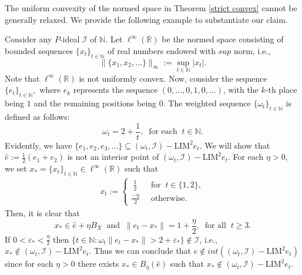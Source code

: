 \documentclass[reqno]{amsart}
\begin{document}
{The uniform convexity of the normed space in  Theorem \ref{strict convex} cannot be generally relaxed. We provide the following example to substantiate  our claim.
\begin{example} \label{ex 2.12}
	Consider any $P$-ideal $\mathcal{I}$ of $\mathbb{N}.$
	Let $\ell^\infty(\mathbb{R})$ be the normed  space consisting of  bounded sequences $\{x_t\}_{t\in\mathbb{N}}$ of real numbers endowed with $sup$ norm, i.e.,
	$$\|\{x_1,x_2,...\}\|_{\infty}:=\displaystyle\sup_{t\in\mathbb{N}}|x_t|.$$ 
	Note that $\ell^\infty(\mathbb{R})$  is not uniformly convex. Now, consider the sequence $\{e_t\}_{t\in\mathbb{N}},$ where $e_k$ represents the sequence $(0,...,0,1,0,...)$, with the $k$-th place being $1$ and the remaining positions being $0$.
	The weighted sequence $\{\omega_t\}_{t\in\mathbb{N}}$ is defined as follows:
	\begin{equation*}
		\omega_t=2+\frac{1}{t},~\mbox{ for each }~t\in\mathbb{N}.
	\end{equation*}
	Evidently, we have $\{e_1,e_2,e_3,...\}\subseteq (\omega_t,\mathcal{I})-\text{LIM}^{2} e_t$. We will show that $\hat e:=\frac{1}{2}(e_1+e_2)$ is not an interior point of $(\omega_t,\mathcal{I})-\text{LIM}^{2}e_t$. For each $\eta>0,$ we set $x_*=\{x_t\}_{t\in\mathbb{N}}\in\ell^\infty(\mathbb{R})$ such that 
	\begin{align*}
		x_{t}:=
		\begin{cases}
			~\frac{1}{2}~&\text{ for }~t\in \{1,2\}, \\
			\frac{-\eta}{2}~&\text{ otherwise}.
		\end{cases}
\end{align*}	 
	Then, it is clear that  
	$$
	x_*\in \hat{e}+{\eta}{B}_X~ \mbox{ and } ~ \|e_t-x_*\|=1+\frac{\eta}{2},~\mbox{ for all }~t\geq 3.
	$$
	If $0<\varepsilon_*<\frac{\eta}{2}$ then $\{t\in\mathbb{N}:\omega_t\|e_t-x_*\|>2+ \varepsilon_* \}\notin\mathcal{I}$, i.e., $x_*\notin (\omega_t,\mathcal{I})-\text{LIM}^{2} e_t$. Thus we can conclude that $\hat e\notin int ((\omega_t,\mathcal{I})-\text{LIM}^{2} e_t)$ since
	  for each $\eta>0$ there exists $x_*\in {B}_{\eta}(\hat{e})$ such that $x_*\notin (\omega_t,\mathcal{I})-\text{LIM}^{2} e_t$.
	
\end{example}

}
\end{document}
